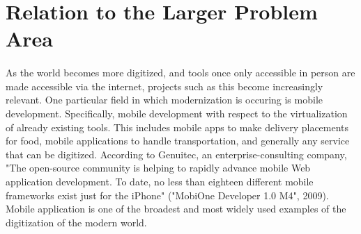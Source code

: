         
       
    
    
\section{Relation to the Larger Problem Area}
    \paragraph{}
     As the world becomes more digitized, and tools once only accessible in person are made accessible via the internet, projects such as this become increasingly relevant. One particular field in which modernization is occuring is mobile development. Specifically, mobile development with respect to the virtualization of already existing tools. This includes mobile apps to make delivery placements for food, mobile applications to handle transportation, and generally any service that can be digitized. According to Genuitec, an enterprise-consulting company, "The open-source community is helping to rapidly advance mobile Web application development. To date, no less than eighteen different mobile frameworks exist just for the iPhone" ("MobiOne Developer 1.0 M4", 2009). Mobile application is one of the broadest and most widely used examples of the digitization of the modern world. 
     
